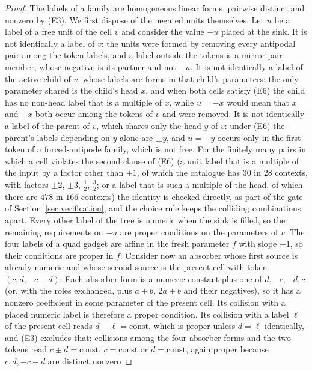\documentclass[11pt,a4paper]{article}
\theoremstyle{plain}
\theoremstyle{definition}
\theoremstyle{remark}
\begin{document}
\begin{proof}
The labels of a family are homogeneous linear forms, pairwise distinct and
nonzero by (E3).  We first dispose of the negated units themselves.  Let $u$
be a label of a free unit of the cell $v$ and consider the value $-u$ placed
at the sink.  It is not identically a label of $v$: the units were formed by
removing every antipodal pair among the token labels, and a label outside the
tokens is a mirror-pair member, whose negative is its partner and not $-u$.
It is not identically a label of the active child of $v$, whose labels are
forms in that child's parameters: the only parameter shared is the child's
head $x$, and when both cells satisfy (E6) the child has no non-head label
that is a multiple of $x$, while $u=-x$ would mean that $x$ and $-x$ both
occur among the tokens of $v$ and were removed.  It is not identically a
label of the parent of $v$, which shares only the head $y$ of $v$: under (E6)
the parent's labels depending on $y$ alone are $\pm y$, and $u=-y$ occurs
only in the first token of a forced-antipode family, which is not free.  For
the finitely many pairs in which a cell violates the second clause of (E6)
(a unit label that is a multiple of the input by a factor other than $\pm1$,
of which the catalogue has $30$ in $28$ contexts, with factors $\pm2$, $\pm3$,
$\tfrac12$, $\tfrac32$; or a label that is such a multiple of the head, of
which there are $478$ in $166$ contexts) the identity is checked directly, as
part of the gate of Section~\ref{sec:verification}, and the choice rule keeps
the colliding combinations apart.  Every other label of the tree is numeric
when the sink is filled, so the remaining requirements on $-u$ are proper
conditions on the parameters of $v$.  The four labels of a quad gadget are affine in the fresh parameter $f$
with slope $\pm 1$, so their conditions are proper in $f$.  Consider now an
absorber whose first source is already numeric
and whose second source is the present cell with token $(c,d,-c-d)$.  Each
absorber form is a numeric constant plus one of $d,-c,-d,c$ (or, with the
roles exchanged, plus $a+b$, $2a+b$ and their negatives), so it has a nonzero
coefficient in some parameter of the present cell.  Its collision with a
placed numeric label is therefore a proper condition.  Its collision with a
label $\ell$ of the present cell reads $d-\ell=\mathrm{const}$, which is proper
unless $d=\ell$ identically, and (E3) excludes that; collisions among the four
absorber forms and the two tokens read $c\pm d=\mathrm{const}$, $c=\mathrm{const}$
or $d=\mathrm{const}$, again proper because $c,d,-c-d$ are distinct nonzero

\end{proof}
\end{document}
